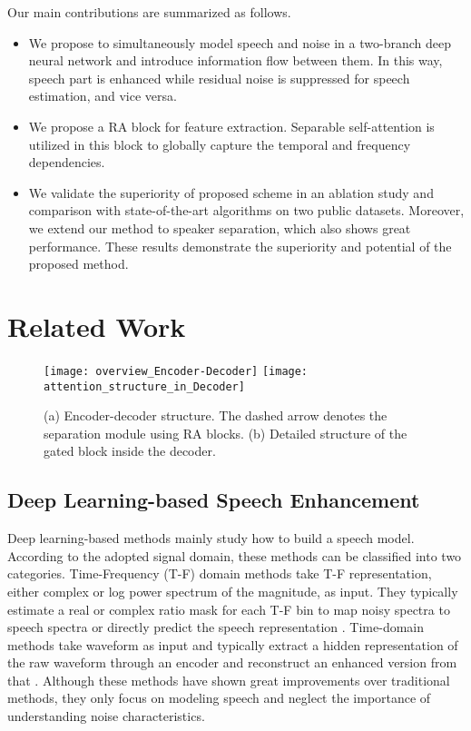 \documentclass[letterpaper]{article} \usepackage{snnet}  \usepackage{times}  \usepackage{helvet} \usepackage{courier}  \usepackage[hyphens]{url}  \usepackage{graphicx} \urlstyle{rm} \def\UrlFont{\rm}  \usepackage{graphicx}  \usepackage{natbib}  \usepackage{caption} \usepackage{amsfonts}  \usepackage{amsmath}  \usepackage{multirow} \usepackage{tablefootnote}  \usepackage[switch]{lineno}
\begin{document}
Our main contributions are summarized as follows.

\begin{itemize}
    \item We propose to simultaneously model speech and noise in a two-branch deep neural network and introduce information flow between them. In this way, speech part is enhanced while residual noise is suppressed for speech estimation, and vice versa.
    \item We propose a RA block for feature extraction. Separable self-attention is utilized in this block to globally capture the temporal and frequency dependencies.
    \item We validate the superiority of proposed scheme in an ablation study and comparison with state-of-the-art algorithms on two public datasets. Moreover, we extend our method to speaker separation, which also shows great performance. These results demonstrate the superiority and potential of the proposed method.
\end{itemize}

\section{Related Work}

\begin{figure*}[ht]
    \centering
    \texttt{[image: overview\_Encoder-Decoder]}
    \texttt{[image: attention\_structure\_in\_Decoder]}
    \caption{(a) Encoder-decoder structure. The dashed arrow denotes the separation module using RA blocks. (b) Detailed structure of the gated block inside the decoder.}
    \label{fig2}
\end{figure*}

\subsection{Deep Learning-based Speech Enhancement}

\noindent Deep learning-based methods mainly study how to build a speech model. According to the adopted signal domain, these methods can be classified into two categories. Time-Frequency (T-F) domain methods take T-F representation, either complex or log power spectrum of the magnitude, as input. They typically estimate a real or complex ratio mask for each T-F bin to map noisy spectra to speech spectra \cite{williamson2015complex, wang2014IRM, choi2019phase} or directly predict the speech representation \cite{xu2013experimental, tan2018convolutional}. Time-domain methods take waveform as input and typically extract a hidden representation of the raw waveform through an encoder and reconstruct an enhanced version from that \cite{fu2017raw, pascual2017segan, pandey2019tcnn}. Although these methods have shown great improvements over traditional methods, they only focus on modeling speech and neglect the importance of understanding noise characteristics.
\end{document}
